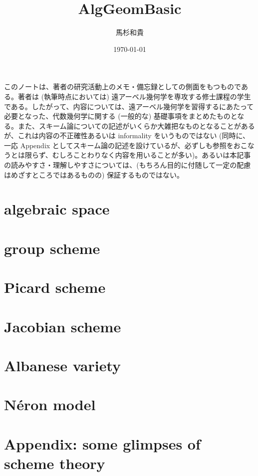 \documentclass{jsarticle}
\title{AlgGeomBasic}
\author{馬杉和貴}
\date{\today}
\begin{document}
\maketitle

このノートは、著者の研究活動上のメモ・備忘録としての側面をもつものである。著者は (執筆時点においては) 遠アーベル幾何学を専攻する修士課程の学生である。したがって、内容については、遠アーベル幾何学を習得するにあたって必要となった、代数幾何学に関する (一般的な) 基礎事項をまとめたものとなる。また、スキーム論についての記述がいくらか大雑把なものとなることがあるが、これは内容の不正確性あるいは informality をいうものではない (同時に、一応 Appendix としてスキーム論の記述を設けているが、必ずしも参照をおこなうとは限らず、むしろことわりなく内容を用いることが多い)。あるいは本記事の読みやすさ・理解しやすさについては、(もちろん目的に付随して一定の配慮はめざすところではあるものの) 保証するものではない。

\tableofcontents
\newpage
\section{algebraic space}

\newpage
\section{group scheme}



\newpage
\section{Picard scheme}



\newpage
\section{Jacobian scheme}


\newpage
\section{Albanese variety}

\newpage
\section{N\'{e}ron model}

\newpage
\section{Appendix: some glimpses of scheme theory}


\end{document}

